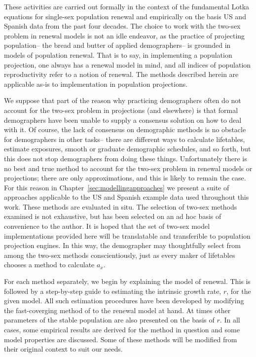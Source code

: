 These activities are carried out formally in the context of the fundamental
Lotka equations for single-sex population renewal and empirically on the basis 
US and Spanish data from the past four decades. The choice to work with the two-sex problem in
renewal models is not an idle endeavor, as the practice of projecting
population-- the bread and butter of applied demographers-- is grounded in
models of population renewal. That is to say, in implementing a population 
projection, one always has a renewal model in mind, and all indices of
population reproductivity refer to a notion of renewal. The methods
described herein are applicable as-is to implementation in population
projections.

We suppose that part of the reason why practicing
demographers often do not account for the two-sex problem in projections (and 
elsewhere) is that formal demographers have been unable to supply a
consensus solution on how to deal with it. Of course, the lack of consensus on
demographic methods is no obstacle for demographers in other tasks-- there are 
different ways to calculate lifetables, estimate exposures, smooth or graduate
demographic schedules, and so forth, but this does not stop demographers from
doing these things. Unfortunately there is no
best and true method to account for the two-sex problem in renewal models or projections; 
there are only approximations, and this is likely to remain the case. For this
reason in Chapter~\ref{sec:modellingapproaches} we present a suite of 
approaches applicable to the US and Spanish example data 
used throughout this work. These methods are evaluated in situ. The selection of
two-sex methods examined is not exhaustive, but has been selected on
an ad hoc basis of convenience to the author. It is hoped that the set of
two-sex model implementations provided here will be translatable and
transferible to population projection engines. In this way, the demographer may
thoughtfully select from among the two-sex methods conscientiously, just as
every maker of lifetables chooses a method to calculate $a_x$.

For each method separately, we begin by explaining the model of renewal. This
is followed by a step-by-step guide to estimating the intrinsic growth rate,
$r$, for the given model. All such estimation procedures have been developed by
modifying the fast-coverging method of \citet{coale1957new} to the renewal model
at hand. At times other parameters of the stable population are also presented
on the basis of $r$. In all cases, some empirical results are derived for the
method in question and some model properties are discussed. Some of these
methods will be modified from their original context to suit our needs.

